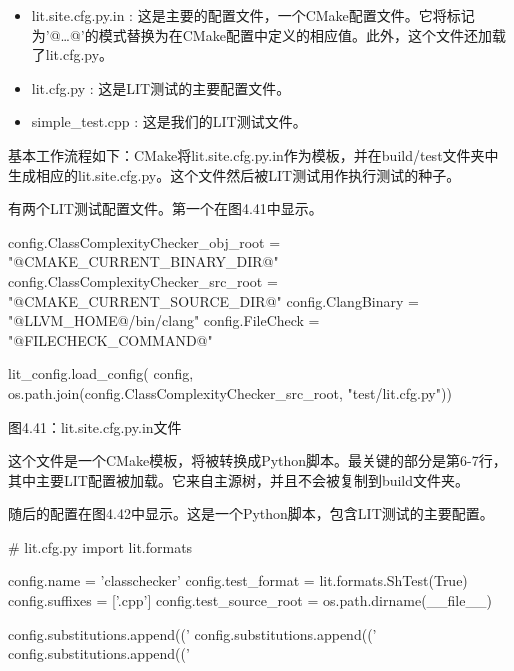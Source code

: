 \begin{itemize}
\item
lit.site.cfg.py.in : 这是主要的配置文件，一个CMake配置文件。它将标记为'@…@'的模式替换为在CMake配置中定义的相应值。此外，这个文件还加载了lit.cfg.py。

\item
lit.cfg.py : 这是LIT测试的主要配置文件。

\item
simple\_test.cpp : 这是我们的LIT测试文件。
\end{itemize}

基本工作流程如下：CMake将lit.site.cfg.py.in作为模板，并在build/test文件夹中生成相应的lit.site.cfg.py。这个文件然后被LIT测试用作执行测试的种子。


有两个LIT测试配置文件。第一个在图4.41中显示。

\begin{python}
config.ClassComplexityChecker_obj_root = "@CMAKE_CURRENT_BINARY_DIR@"
config.ClassComplexityChecker_src_root = "@CMAKE_CURRENT_SOURCE_DIR@"
config.ClangBinary = "@LLVM_HOME@/bin/clang"
config.FileCheck = "@FILECHECK_COMMAND@"

lit_config.load_config(
  config, os.path.join(config.ClassComplexityChecker_src_root, "test/lit.cfg.py"))
\end{python}

\begin{center}
图4.41：lit.site.cfg.py.in文件
\end{center}

这个文件是一个CMake模板，将被转换成Python脚本。最关键的部分是第6-7行，其中主要LIT配置被加载。它来自主源树，并且不会被复制到build文件夹。

随后的配置在图4.42中显示。这是一个Python脚本，包含LIT测试的主要配置。

\begin{python}
# lit.cfg.py
import lit.formats

config.name = 'classchecker'
config.test_format = lit.formats.ShTest(True)
config.suffixes = ['.cpp']
config.test_source_root = os.path.dirname(__file__)

config.substitutions.append(('%
config.substitutions.append(('%
config.substitutions.append(('%
\end{python}

